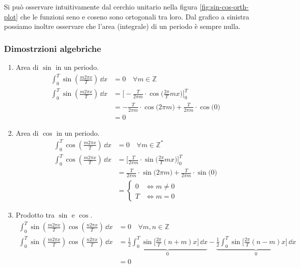 Si pu\`o osservare intuitivamente dal cerchio unitario nella figura
\ref{fig:sin-cos-orth-plot} che le funzioni seno e coseno sono ortogonali tra
loro. Dal grafico a sinistra possiamo inoltre osservare che l'area (integrale)
di un periodo \`e sempre nulla.

\subsubsection{Dimostrzioni algebriche}
\begin{enumerate}
\item {
    Area di \(\sin\) in un periodo.
    \begin{align*}
        \int_0^T \sin(\frac{m2\pi x}{T})\,\dd{x} &= 0
        \quad \forall m \in \mathbb{Z} \\
        \int_0^T \sin(\frac{m2\pi x}{T})\,\dd{x}
        &= \bigg [-\frac{T}{2\pi m }\cdot\cos\big(\frac{2\pi}{T}mx\big)\bigg]^T_0 \\
        &= -\frac{T}{2\pi m}\cdot\cos\big(2\pi m\big) 
            +\frac{T}{2\pi m}\cdot\cos\big(0\big) \\
        &= 0
    \end{align*}
}

\item {
    Area di \(\cos\) in un periodo.
    \begin{align*}
        \int_0^T \cos(\frac{m2\pi x}{T})\,\dd{x} &= 0
        \quad \forall m \in \mathbb{Z}^* \\
        \int_0^T \cos(\frac{m2\pi x}{T})\,\dd{x}
        &= \bigg [\frac{T}{2\pi m}\cdot\sin\big(\frac{2\pi}{T}mx\big)\bigg]^T_0 \\
        &= \frac{T}{2\pi m}\cdot\sin\big(2\pi m\big) 
            +\frac{T}{2\pi m}\cdot\sin\big(0\big) \\
        &= \begin{cases}
            0 & \iff m \neq 0 \\
            T & \iff m = 0 
        \end{cases}
    \end{align*}
}

\item {
    Prodotto tra \(\sin\) e \(\cos\).
    \begin{align*}
        \int_0^T \sin(\frac{m2\pi x}{T})\cos(\frac{n2\pi x}{T})\,\dd{x} &= 0
        \quad \forall m,n \in \mathbb{Z} \\
        \int_0^T \sin(\frac{m2\pi x}{T})\cos(\frac{n2\pi x}{T})\,\dd{x} &=
        \underbrace{\frac{1}{2}\int_0^T\sin\bigg[\frac{2\pi}{T}(n+m)x\bigg]\,\dd{x}}_{0} - 
        \underbrace{\frac{1}{2}\int_0^T\sin\bigg[\frac{2\pi}{T}(n-m)x\bigg]\,\dd{x}}_{0} \\
        &= 0 \\
    \end{align*}
}


\end{enumerate}
